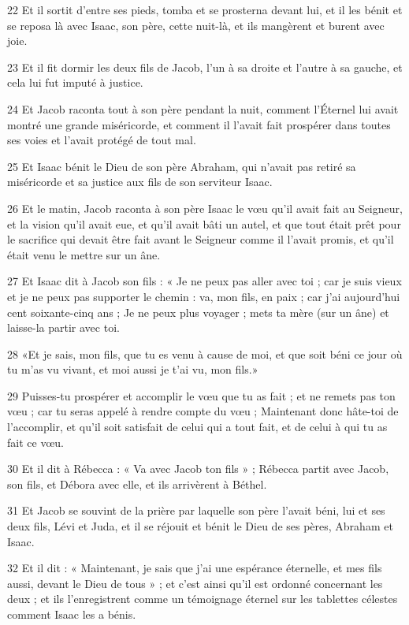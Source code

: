 \par 22 Et il sortit d'entre ses pieds, tomba et se prosterna devant lui, et il les bénit et se reposa là avec Isaac, son père, cette nuit-là, et ils mangèrent et burent avec joie.
\par 23 Et il fit dormir les deux fils de Jacob, l'un à sa droite et l'autre à sa gauche, et cela lui fut imputé à justice.
\par 24 Et Jacob raconta tout à son père pendant la nuit, comment l'Éternel lui avait montré une grande miséricorde, et comment il l'avait fait prospérer dans toutes ses voies et l'avait protégé de tout mal.
\par 25 Et Isaac bénit le Dieu de son père Abraham, qui n'avait pas retiré sa miséricorde et sa justice aux fils de son serviteur Isaac.
\par 26 Et le matin, Jacob raconta à son père Isaac le vœu qu'il avait fait au Seigneur, et la vision qu'il avait eue, et qu'il avait bâti un autel, et que tout était prêt pour le sacrifice qui devait être fait avant le Seigneur comme il l'avait promis, et qu'il était venu le mettre sur un âne.
\par 27 Et Isaac dit à Jacob son fils : « Je ne peux pas aller avec toi ; car je suis vieux et je ne peux pas supporter le chemin : va, mon fils, en paix ; car j'ai aujourd'hui cent soixante-cinq ans ; Je ne peux plus voyager ; mets ta mère (sur un âne) et laisse-la partir avec toi.
\par 28 «Et je sais, mon fils, que tu es venu à cause de moi, et que soit béni ce jour où tu m'as vu vivant, et moi aussi je t'ai vu, mon fils.»
\par 29 Puisses-tu prospérer et accomplir le vœu que tu as fait ; et ne remets pas ton vœu ; car tu seras appelé à rendre compte du vœu ; Maintenant donc hâte-toi de l'accomplir, et qu'il soit satisfait de celui qui a tout fait, et de celui à qui tu as fait ce vœu.
\par 30 Et il dit à Rébecca : « Va avec Jacob ton fils » ; Rébecca partit avec Jacob, son fils, et Débora avec elle, et ils arrivèrent à Béthel.
\par 31 Et Jacob se souvint de la prière par laquelle son père l'avait béni, lui et ses deux fils, Lévi et Juda, et il se réjouit et bénit le Dieu de ses pères, Abraham et Isaac.
\par 32 Et il dit : « Maintenant, je sais que j'ai une espérance éternelle, et mes fils aussi, devant le Dieu de tous » ; et c'est ainsi qu'il est ordonné concernant les deux ; et ils l'enregistrent comme un témoignage éternel sur les tablettes célestes comment Isaac les a bénis.

